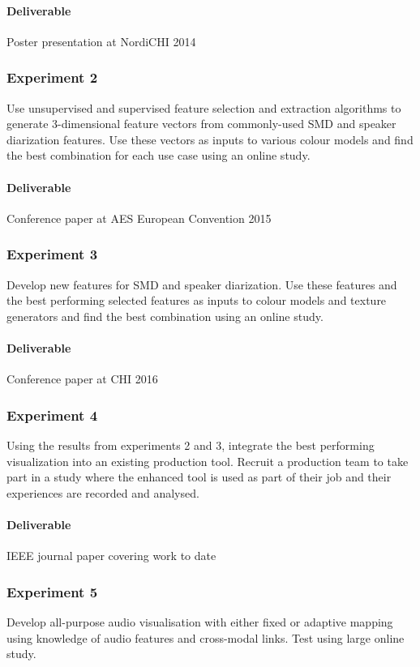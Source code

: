 \paragraph{Deliverable}
Poster presentation at NordiCHI 2014

\subsubsection{Experiment 2}
Use unsupervised and supervised feature selection and extraction algorithms to
generate 3-dimensional feature vectors from commonly-used SMD and speaker
diarization features. Use these vectors as inputs to various colour models and
find the best combination for each use case using an online study.

\paragraph{Deliverable}
Conference paper at AES European Convention 2015

\subsubsection{Experiment 3}
Develop new features for SMD and speaker diarization. Use these features
and the best performing selected features as inputs to colour models and
texture generators and find the best combination using an online study.

\paragraph{Deliverable}
Conference paper at CHI 2016

\subsubsection{Experiment 4}
Using the results from experiments 2 and 3, integrate the best performing
visualization into an existing production tool. Recruit a production team to
take part in a study where the enhanced tool is used as part of their job and
their experiences are recorded and analysed.

\paragraph{Deliverable}
IEEE journal paper covering work to date

\subsubsection{Experiment 5}
Develop all-purpose audio visualisation with either fixed or adaptive mapping
using knowledge of audio features and cross-modal links. Test using large
online study.

